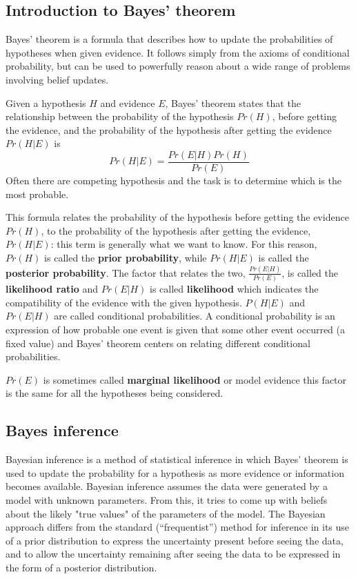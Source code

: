 \documentclass[12pt, letterpaper]{article}
\theoremstyle{definition}
\begin{document}
\subsection{Introduction to Bayes' theorem}
Bayes' theorem is a formula that describes how to update the probabilities of hypotheses when given evidence. It follows simply from the axioms of conditional probability, but can be used to powerfully reason about a wide range of problems involving belief updates.

Given a hypothesis $H$ and evidence $E$, Bayes' theorem states that the relationship between the probability of the hypothesis $Pr(H)$, before getting the evidence, and the probability of the hypothesis after getting the evidence $Pr(H|E)$ is
\begin{equation}
Pr(H|E) = \frac{Pr(E|H)Pr(H)}{Pr(E)}
\end{equation}
Often there are competing hypothesis and the task is to determine which is the most probable.

This formula relates the probability of the hypothesis before getting the evidence $Pr(H)$, to the probability of the hypothesis after getting the evidence, $Pr(H|E)$: this term is generally what we want to know. For this reason, $Pr(H)$ is called the \textbf{prior probability}, while 
$Pr(H|E)$ is called the \textbf{posterior probability}. The factor that relates the two, $\frac{Pr(E|H)}{Pr(E)}$, is called the \textbf{likelihood ratio} and $Pr(E|H)$ is called \textbf{likelihood} which indicates the compatibility of the evidence with the given hypothesis.
$P(H|E)$ and $Pr(E|H)$ are called conditional probabilities. A conditional probability is an expression of how probable one event is given that some other event occurred (a fixed value) and Bayes' theorem centers on relating different conditional probabilities.

$Pr(E)$ is sometimes called \textbf{marginal likelihood} or model evidence this factor is the same for all the hypotheses being considered.

\subsection{Bayes inference}
Bayesian inference is a method of statistical inference in which Bayes' theorem is used to update the probability for a hypothesis as more evidence or information becomes available. Bayesian inference assumes the data were generated by a model with unknown parameters. From this, it tries to come up with beliefs about the likely  "true values" of the parameters of the model. The Bayesian approach differs from the standard (“frequentist”) method for inference in its use of a prior distribution to express the uncertainty present before seeing the data, and to allow the uncertainty remaining after seeing the data to be expressed in the form of a posterior distribution.
\end{document}
